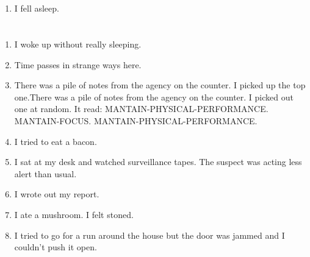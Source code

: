 \documentclass{article}
\begin{document}
    \newpage
    
    \section{}
    
    \begin{enumerate}
    
    \item I fell asleep.\\
    
    \end{enumerate}
     
    \newpage
    
    \section{}
    
    \begin{enumerate}
    
    \item I woke up without really sleeping.\\
    
    \item Time passes in strange ways here.\\
    
    \item There was a pile of notes from the agency on the counter. I picked up the top one.There was a pile of notes from the agency on the counter. I picked out one at random. It read: MANTAIN-PHYSICAL-PERFORMANCE. MANTAIN-FOCUS. MANTAIN-PHYSICAL-PERFORMANCE.\\
    
    \item I tried to eat a bacon.\\
    
    \item I sat at my desk and watched surveillance tapes. The suspect was acting less alert than usual.\\
    
    \item I wrote out my report.\\
    
    \item I ate a mushroom. I felt stoned.\\
    
    \item I tried to go for a run around the house but the door was jammed and I couldn't push it open.\\
    
    \end{enumerate}
     
\end{document}
